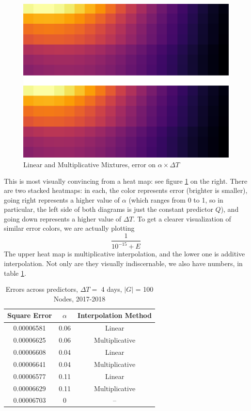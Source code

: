 \documentclass{article}
\theoremstyle{definition}
\begin{document}
	
	\begin{figure}
		\includegraphics[width=\linewidth]{figs/heatmaps/t_mult,t_lin.png}
		\caption{\color{darkgray} Linear and Multiplicative Mixtures, error on $\alpha \times \Delta T$}
		\label{fig:multadd}
	\end{figure}
	This is most visually convincing from a heat map: see figure \ref{fig:multadd} on the right. There are two stacked heatmaps: in each, the color represents error (brighter is smaller), going right represents a higher value of $\alpha$ (which ranges from 0 to 1, so in particular, the left side of both diagrams is just the constant predictor $Q$), and going down represents a higher value of $\Delta T$. 	
	To get a clearer visualization of similar error colors, we are actually plotting 
	\[ \frac{1}{10^{-15} + E} \]
	The upper heat map is multiplicative interpolation, and the lower one is additive interpolation. Not only are they visually indiscernable, we also have numbers, in table \ref{tab:multadd}. 

	
	\begin{table}[h!]
		\centering
		
		\begin{tabular}{c|cc}
			 Square Error & $\alpha$ & Interpolation Method \\\hline
			0.00006581 & 0.06 & Linear \\
			0.00006625 & 0.06 & Multiplicative\\
			0.00006608 & 0.04 & Linear \\
			0.00006641 & 0.04 & Multiplicative \\
			0.00006577 & 0.11 & Linear \\
			0.00006629 & 0.11 & Multiplicative \\
			0.00006703 & 0	& --
		\end{tabular}
		\caption{Errors across predictors, $\Delta T = $ 4 days, $|G|$ = 100 Nodes, 2017-2018}\label{tab:multadd}
	\end{table}
	
\end{document}
